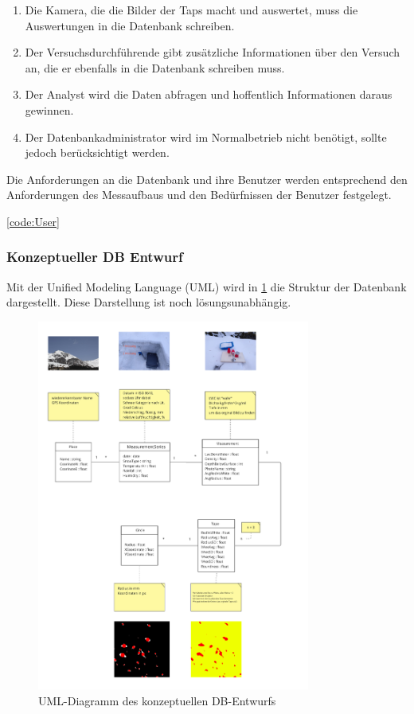 \begin{enumerate}
\item Die Kamera, die die Bilder der Taps macht und auswertet, muss die Auswertungen in die Datenbank schreiben.
  \item Der Versuchsdurchführende gibt zusätzliche Informationen über den Versuch an, die er ebenfalls in die Datenbank schreiben muss.
    
    \item Der Analyst wird die Daten abfragen und hoffentlich Informationen daraus gewinnen.
    
    \item Der Datenbankadministrator wird im Normalbetrieb nicht benötigt, sollte jedoch berücksichtigt werden.
\end{enumerate}

Die Anforderungen an die Datenbank und ihre Benutzer werden entsprechend den Anforderungen des Messaufbaus und den Bedürfnissen der Benutzer festgelegt.

\ref{code:User}

\subsubsection{Konzeptueller DB Entwurf}

Mit der Unified Modeling Language (UML) wird in  \ref{fig:uml-db-entwurf} die Struktur der Datenbank dargestellt. Diese Darstellung ist noch lösungsunabhängig.

\begin{figure}
    \centering
    \includegraphics[width=0.8\textwidth]{Bilder/Screenshotfrom2024-04-1418-05-35.png}
    \caption{UML-Diagramm des konzeptuellen DB-Entwurfs}
    \label{fig:uml-db-entwurf}
\end{figure}



